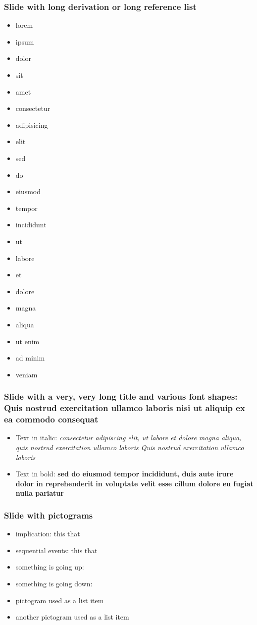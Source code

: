 \expandafter\documentclass\expandafter[\presentationclassoptions]{beamer}
\begin{document}
\begin{frame}[allowframebreaks=0.8]
  \frametitle{Slide with long derivation or long reference list}
  \begin{itemize}
    \item lorem
    \item ipsum
    \item dolor
    \item sit
    \item amet
    \item consectetur
    \item adipisicing
    \item elit
    \item sed
    \item do
    \item eiusmod
    \item tempor
    \item incididunt
    \item ut
    \item labore
    \item et
    \item dolore
    \item magna
    \item aliqua
    \item ut enim
    \item ad minim
    \item veniam
  \end{itemize}
\end{frame}

\begin{frame}
  \frametitle{Slide with a very, very long title and various font shapes: Quis nostrud exercitation ullamco laboris nisi ut aliquip ex ea commodo consequat}
  \begin{itemize}
    \item Text in italic: \textit{consectetur adipiscing elit, ut labore et dolore magna aliqua, quis nostrud exercitation ullamco laboris Quis nostrud exercitation ullamco laboris}
    \item Text in bold: \textbf{sed do eiusmod tempor incididunt, duis aute irure dolor in reprehenderit in voluptate velit esse cillum dolore eu fugiat nulla pariatur}
  \end{itemize}
\end{frame}

\begin{frame}
  \frametitle{Slide with pictograms}
  \begin{itemize}
    \item implication: this \so that
    \item sequential events: this \then that
    \item something is going up: \up
    \item something is going down: \down
    \item[\so] pictogram used as a list item
    \item[\then] another pictogram used as a list item
  \end{itemize}
\end{frame}
\end{document}

